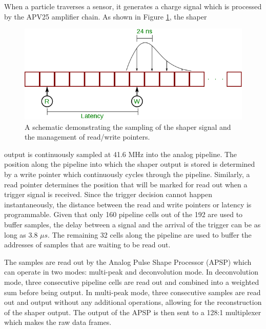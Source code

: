 When a particle traverses a sensor, it generates a charge signal which is 
processed by the APV25 amplifier chain.  As shown in Figure 
\ref{fig:apv25_pipeline}, the shaper
\begin{figure}
    \centering
    \includegraphics[width=\textwidth]{images/apv25_pipeline.png}
    \caption{A schematic demonstrating the sampling of the shaper signal and
             the management of read/write pointers.}
    \label{fig:apv25_pipeline}
\end{figure}
output is continuously sampled at 41.6 MHz into the analog pipeline. The position
along the pipeline into which the shaper output is stored is determined by 
a write pointer which continuously cycles through the pipeline.  Similarly, a read 
pointer determines the position that will be marked for read out when a trigger
signal is received.  Since the trigger decision cannot happen instantaneously,
the distance between the read and write pointers or latency is programmable.
Given that only 160 pipeline cells out of the 192 are used
to buffer samples, the delay between a signal and the arrival of the trigger can
be as long as 3.8 $\mu s$. The remaining 32 cells along the pipeline are used 
to buffer the addresses of samples that are waiting to be read out.

The samples  are read out by the Analog Pulse Shape Processor (APSP) which
can operate in two modes: multi-peak and deconvolution mode.  In deconvolution
mode, three consecutive pipeline cells are read out and combined into a 
weighted sum before being output. In multi-peak mode, three consecutive samples are
read out and output without any additional operations, allowing for the 
reconstruction of the shaper output.  The output of 
the APSP is then sent to a 128:1 multiplexer which makes the raw data 
frames. 


